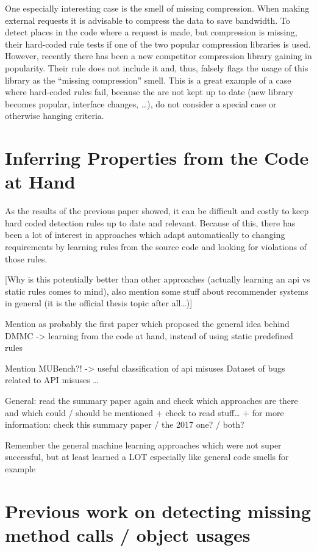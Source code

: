 One especially interesting case is the smell of missing compression.
When making external requests it is advisable to compress the data to save bandwidth.
To detect places in the code where a request is made, but compression is missing, their hard-coded rule tests if one of the two popular compression libraries is used.
However, recently there has been a new competitor compression library gaining in popularity.
Their rule does not include it and, thus, falsely flags the usage of this library as the ``missing compression'' smell.
This is a great example of a case where hard-coded rules fail, because the are not kept up to date (new library becomes popular, interface changes, \ldots), do not consider a special case or otherwise hanging criteria.

\section{Inferring Properties from the Code at Hand}

As the results of the previous paper showed, it can be difficult and costly to keep hard coded detection rules up to date and relevant.
Because of this, there has been a lot of interest in approaches which adapt automatically to changing requirements by learning rules from the source code and looking for violations of those rules.

[Why is this potentially better than other approaches (actually learning an api vs static rules comes to mind),
also mention some stuff about recommender systems in general (it is the official thesis topic after all\ldots)]

Mention \cite{engler2001bugs} as probably the first paper which proposed the general idea behind DMMC -> learning from the code at hand, instead of using static predefined rules

Mention MUBench?!
    -> useful classification of api misuses
    Dataset of bugs related to API misuses
    \ldots

General: read the summary paper \cite{robillard2013automated} again and check which approaches are there and which could / should be mentioned
+ check to read stuff\ldots
+ for more information: check this summary paper / the 2017 one? / both?

Remember the general machine learning approaches which were not super successful, but at least learned a LOT
especially like general code smells for example

\section{Previous work on detecting missing method calls / object usages}

